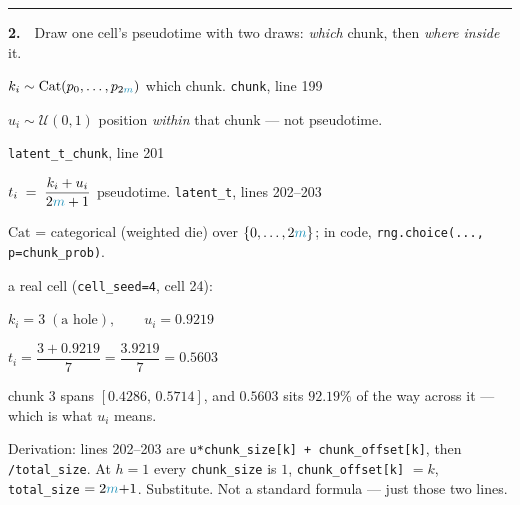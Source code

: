 \documentclass[11pt]{article}
\newcommand{\mm}{{\color{cy}m}}
\newcommand{\stepttl}[2]{{\sffamily\color{stepn}\textbf{#1}\ \ #2}}
\newcommand{\gloss}[1]{{\sffamily\scriptsize\color{lab}#1}}
\begin{document}
\vspace{2.5mm}
\hrule
\vspace{2mm}

\stepttl{2.}{Draw one cell's pseudotime with two draws: \emph{which} chunk, then \emph{where inside} it.}

\vspace{1mm}
\begin{minipage}[t]{0.52\textwidth}
\vspace{0pt}
$\displaystyle k_i \sim \mathrm{Cat}(p_0,\dots,p_{2\mm})$
\hfill \gloss{which chunk. \texttt{chunk}, line 199}

\vspace{2mm}
$\displaystyle u_i \sim \mathcal{U}(0,1)$
\hfill \gloss{position \emph{within} that chunk --- not pseudotime.}

\hfill \gloss{\texttt{latent\_t\_chunk}, line 201}

\vspace{2mm}
$\displaystyle t_i \;=\; \frac{k_i + u_i}{2\mm+1}$
\hfill \gloss{pseudotime. \texttt{latent\_t}, lines 202--203}

\vspace{2.5mm}
\gloss{$\mathrm{Cat}$ = categorical (weighted die) over $\{0,\dots,2\mm\}$; in code,
\texttt{rng.choice(..., p=chunk\_prob)}.}
\end{minipage}
\hfill
\begin{minipage}[t]{0.44\textwidth}
\vspace{0pt}
{\sffamily\small a real cell (\texttt{cell\_seed=4}, cell 24):}

\vspace{1mm}
$k_i = 3 \;(\text{a hole}), \qquad u_i = 0.9219$

$t_i = \dfrac{3 + 0.9219}{7} = \dfrac{3.9219}{7} = 0.5603$

\vspace{1mm}
\gloss{chunk 3 spans $[0.4286,\,0.5714]$, and $0.5603$ sits $92.19\%$ of
the way across it --- which is what $u_i$ means.}

\vspace{1.5mm}
\gloss{Derivation: lines 202--203 are
\texttt{u*chunk\_size[k] + chunk\_offset[k]}, then \texttt{/total\_size}.
At $h=1$ every \texttt{chunk\_size} is $1$, \texttt{chunk\_offset[k]} $=k$,
\texttt{total\_size} $=2\mm{+}1$. Substitute. Not a standard formula --- just those two lines.}
\end{minipage}

\vspace*{\fill}
\newpage
\vspace*{\fill}
\end{document}
